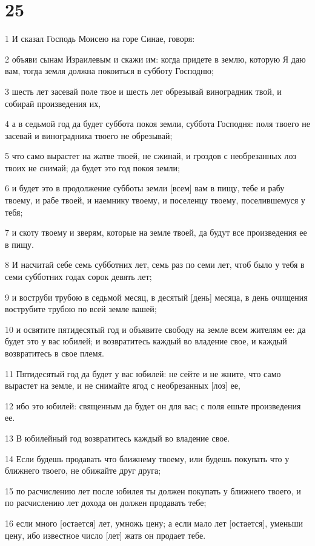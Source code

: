 \chapter{25}

\par 1 И сказал Господь Моисею на горе Синае, говоря:
\par 2 объяви сынам Израилевым и скажи им: когда придете в землю, которую Я даю вам, тогда земля должна покоиться в субботу Господню;
\par 3 шесть лет засевай поле твое и шесть лет обрезывай виноградник твой, и собирай произведения их,
\par 4 а в седьмой год да будет суббота покоя земли, суббота Господня: поля твоего не засевай и виноградника твоего не обрезывай;
\par 5 что само вырастет на жатве твоей, не сжинай, и гроздов с необрезанных лоз твоих не снимай; да будет это год покоя земли;
\par 6 и будет это в продолжение субботы земли [всем] вам в пищу, тебе и рабу твоему, и рабе твоей, и наемнику твоему, и поселенцу твоему, поселившемуся у тебя;
\par 7 и скоту твоему и зверям, которые на земле твоей, да будут все произведения ее в пищу.
\par 8 И насчитай себе семь субботних лет, семь раз по семи лет, чтоб было у тебя в семи субботних годах сорок девять лет;
\par 9 и воструби трубою в седьмой месяц, в десятый [день] месяца, в день очищения вострубите трубою по всей земле вашей;
\par 10 и освятите пятидесятый год и объявите свободу на земле всем жителям ее: да будет это у вас юбилей; и возвратитесь каждый во владение свое, и каждый возвратитесь в свое племя.
\par 11 Пятидесятый год да будет у вас юбилей: не сейте и не жните, что само вырастет на земле, и не снимайте ягод с необрезанных [лоз] ее,
\par 12 ибо это юбилей: священным да будет он для вас; с поля ешьте произведения ее.
\par 13 В юбилейный год возвратитесь каждый во владение свое.
\par 14 Если будешь продавать что ближнему твоему, или будешь покупать что у ближнего твоего, не обижайте друг друга;
\par 15 по расчислению лет после юбилея ты должен покупать у ближнего твоего, и по расчислению лет дохода он должен продавать тебе;
\par 16 если много [остается] лет, умножь цену; а если мало лет [остается], уменьши цену, ибо известное число [лет] жатв он продает тебе.
